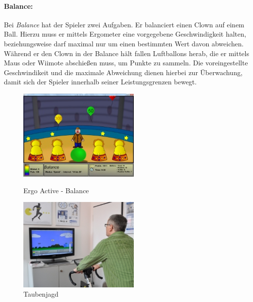\paragraph{Balance:}\noindent
Bei \textit{Balance} hat der Spieler zwei Aufgaben. Er balanciert einen Clown auf einem Ball. Hierzu muss er mittels Ergometer eine vorgegebene Geschwindigkeit halten, beziehungsweise darf maximal nur um einen bestimmten Wert davon abweichen. Während er den Clown in der Balance hält fallen Luftballons herab, die er mittels Maus oder Wiimote abschießen muss, um Punkte zu sammeln. Die voreingestellte Geschwindikeit und die maximale Abweichung dienen hierbei zur Überwachung, damit  sich der Spieler innerhalb seiner Leistungsgrenzen bewegt. 
\begin{figure}[h]
	\centering
	\begin{minipage}[b]{6 cm}
			\includegraphics[width=6cm]{gfx/recherche/balance.jpg} 
			\caption{Ergo Active - Balance}
			\label{balance}
	\end{minipage}
	\begin{minipage}[b]{6 cm}
			\includegraphics[width=6cm]{gfx/recherche/ergoactive.jpg} 
			\caption{Taubenjagd}
			\label{ergoactive}
	\end{minipage}
\end{figure}